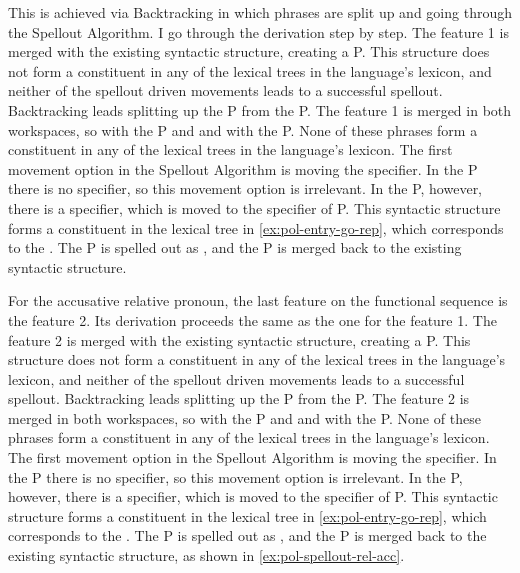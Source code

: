 This is achieved via Backtracking in which phrases are split up and going through the Spellout Algorithm. I go through the derivation step by step.
The feature 1 is merged with the existing syntactic structure, creating a P.
This structure does not form a constituent in any of the lexical trees in the language's lexicon, and neither of the spellout driven movements leads to a successful spellout.
Backtracking leads splitting up the P from the P.
The feature 1 is merged in both workspaces, so with the P and and with the P. None of these phrases form a constituent in any of the lexical trees in the language's lexicon.
The first movement option in the Spellout Algorithm is moving the specifier. In the P there is no specifier, so this movement option is irrelevant. In the P, however, there is a specifier, which is moved to the specifier of P.
This syntactic structure forms a constituent in the lexical tree in \ref{ex:pol-entry-go-rep}, which corresponds to the .
The P is spelled out as , and the P is merged back to the existing syntactic structure.

For the accusative relative pronoun, the last feature on the functional sequence is the feature 2. Its derivation proceeds the same as the one for the feature 1.
The feature 2 is merged with the existing syntactic structure, creating a P.
This structure does not form a constituent in any of the lexical trees in the language's lexicon, and neither of the spellout driven movements leads to a successful spellout.
Backtracking leads splitting up the P from the P.
The feature 2 is merged in both workspaces, so with the P and and with the P. None of these phrases form a constituent in any of the lexical trees in the language's lexicon.
The first movement option in the Spellout Algorithm is moving the specifier. In the P there is no specifier, so this movement option is irrelevant. In the P, however, there is a specifier, which is moved to the specifier of P.
This syntactic structure forms a constituent in the lexical tree in \ref{ex:pol-entry-go-rep}, which corresponds to the .
The P is spelled out as , and the P is merged back to the existing syntactic structure, as shown in \ref{ex:pol-spellout-rel-acc}.

